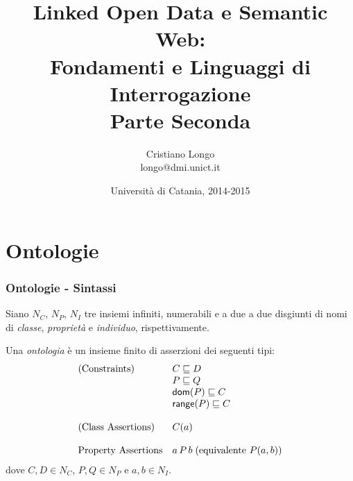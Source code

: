 \documentclass[8pt]{beamer}
\title{Linked Open Data e Semantic Web:\\
Fondamenti e Linguaggi di Interrogazione\\
Parte Seconda}
\author{Cristiano Longo\\ 
{\small{longo@dmi.unict.it}}}
\date{Universit\`a di Catania, 2014-2015}
\begin{document}
\maketitle
\setcounter{tocdepth}{1}

\newcommand{\CNames}{N_C}
\newcommand{\PNames}{N_P}
\newcommand{\INames}{N_I}
\newcommand{\VNames}{V}
\newcommand{\DNames}{N_D}
\newcommand{\LNames}{N_L}
\newcommand{\BlankNodes}{\mathcal{B}}
\newcommand{\IRI}{IRI}


\newcommand{\Ont}{\mathcal{O}}
\newcommand{\Ontp}{\mathcal{O'}}

\newcommand{\datatypes}{\mathcal{D}}
\newcommand{\stringLiteral}[1]{\mbox{``#1''}}
\newcommand{\literal}[2]{\mbox{``#1''\textasciicircum\textasciicircum\url{#2}}} %
\newcommand{\literals}{\mathcal{L}}
\newcommand{\Vocab}{\mathcal{V}}

\section{Ontologie}

\begin{frame}
 \frametitle{Ontologie - Sintassi}

Siano $\CNames$, $\PNames$, $\INames$ tre insiemi infiniti, numerabili e 
a due a due disgiunti di nomi di \emph{classe}, \emph{propriet\`a} e \emph{individuo},
rispettivamente.
\vspace{\baselineskip}

Una \emph{ontologia} \`e un insieme finito di asserzioni dei seguenti tipi:
\[
 \begin{array}{ll}
  \mbox{(Constraints)} & C \sqsubseteq D\\
  & P \sqsubseteq Q \\
  & \mathsf{dom}(P) \sqsubseteq C \\
  & \mathsf{range}(P) \sqsubseteq C \\
  &\\
  \mbox{(Class Assertions)} & C(a)\\
  &\\
  \mbox{Property Assertions} & a\,P\,b\;(\mbox{equivalente }P(a,b))\\
 \end{array}
\]
dove $C, D \in \CNames$, $P, Q \in \PNames$ e $a, b \in \INames$.
\end{frame}
\end{document}
